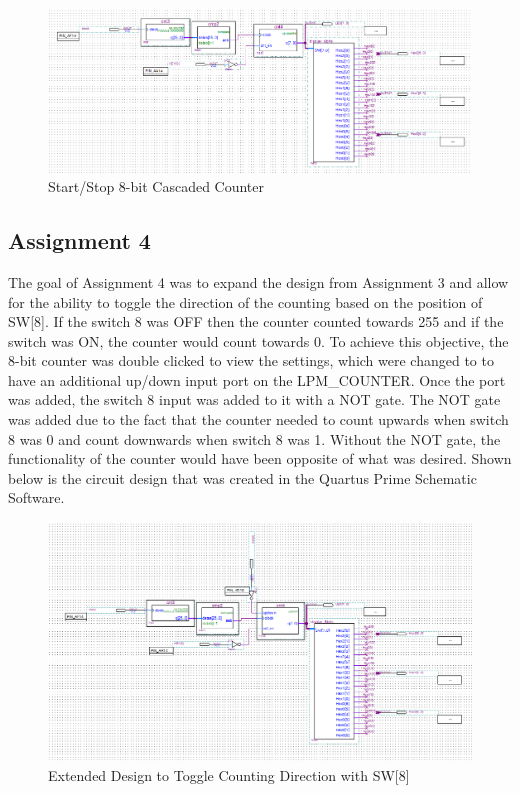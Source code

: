 \documentclass[
	letterpaper, %
	10pt, %
]{CSUniSchoolLabReport}
\begin{document}
\begin{figure}[H]
  \centering
  \includegraphics[width=.72\textwidth]{Figures/Assign3.png}
  \caption{Start/Stop 8-bit Cascaded Counter}
  \label{fig:3}
\end{figure}

\subsection{Assignment 4}

\hspace{.5 in} The goal of Assignment 4 was to expand the design from Assignment 3 and allow for the ability to toggle the direction of the counting based on the position of SW[8]. If the switch 8 was OFF then the counter counted towards 255 and if the switch was ON, the counter would count towards 0. To achieve this objective, the 8-bit counter was double clicked to view the settings, which were changed to to have an additional up/down input port on the \textsc{LPM\_COUNTER}. Once the port was added, the switch 8 input was added to it with a NOT gate. The NOT gate was added due to the fact that the counter needed to count upwards when switch 8 was 0 and count downwards when switch 8 was 1. Without the NOT gate, the functionality of the counter would have been opposite of what was desired. Shown below is the circuit design that was created in the Quartus Prime Schematic Software.

\begin{figure}[H]
  \centering
  \includegraphics[width=.72\textwidth]{Figures/Assign4.png}
  \caption{Extended Design to Toggle Counting Direction with SW[8]}
  \label{fig:4}
\end{figure}
\end{document}

